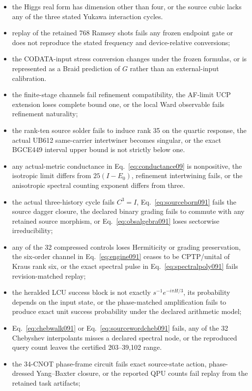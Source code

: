 \documentclass[11pt]{article}
\theoremstyle{definition}
\theoremstyle{remark}
\begin{document}
\begin{itemize}
\item the Higgs real form has dimension other than four, or the source cubic lacks any of the three stated Yukawa interaction cycles.
\item replay of the retained 768 Ramsey shots fails any frozen endpoint gate or does not reproduce the stated frequency and device-relative conversions;
\item the CODATA-input stress conversion changes under the frozen formulas, or is represented as a Braid prediction of $G$ rather than an external-input calibration.
\item the finite-stage channels fail refinement compatibility, the AF-limit UCP extension loses complete bound one, or the local Ward observable fails refinement naturality;
\item the rank-ten source solder fails to induce rank 35 on the quartic response, the actual UB612 same-carrier intertwiner becomes singular, or the exact BGCE449 interval upper bound is not strictly below one.
\item any actual-metric conductance in Eq.~\eqref{eq:conductance09} is nonpositive, the isotropic limit differs from $25(I-E_0)$, refinement intertwining fails, or the anisotropic spectral counting exponent differs from three.
\item the actual three-history cycle fails $C^3=I$, Eq.~\eqref{eq:sourceborn091} fails the source dagger closure, the declared binary grading fails to commute with any retained source morphism, or Eq.~\eqref{eq:obsalgebra091} loses sectorwise irreducibility;
\item any of the 32 compressed controls loses Hermiticity or grading preservation, the six-order channel in Eq.~\eqref{eq:engine091} ceases to be CPTP/unital of Kraus rank six, or the exact spectral pulse in Eq.~\eqref{eq:spectralpoly091} fails revision-matched replay;
\item the heralded LCU success block is not exactly $s^{-1}e^{-i\pi H/3}$, its probability depends on the input state, or the phase-matched amplification fails to produce exact unit success probability under the declared arithmetic model;
\item Eq.~\eqref{eq:chebwalk091} or Eq.~\eqref{eq:sourcewordcheb091} fails, any of the 32 Chebyshev interpolants misses a declared spectral node, or the reproduced query count leaves the certified 203--39,102 range.
\item the 34-CNOT phase-frame circuit fails exact source-state action, phase-dressed Yang--Baxter closure, or the reported QPU counts fail replay from the retained task artifacts;

\end{itemize}
\end{document}
